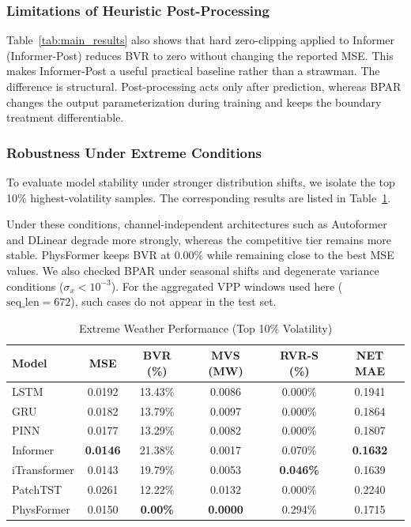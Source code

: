 \subsubsection{Limitations of Heuristic Post-Processing}
\label{subsubsec:compliance}

Table~\ref{tab:main_results} also shows that hard zero-clipping applied to Informer (Informer-Post) reduces BVR to zero without changing the reported MSE. This makes Informer-Post a useful practical baseline rather than a strawman. The difference is structural. Post-processing acts only after prediction, whereas BPAR changes the output parameterization during training and keeps the boundary treatment differentiable.

\subsubsection{Robustness Under Extreme Conditions}
\label{subsubsec:extreme_weather}

To evaluate model stability under stronger distribution shifts, we isolate the top 10\% highest-volatility samples. The corresponding results are listed in Table~\ref{tab:extreme_results}.

Under these conditions, channel-independent architectures such as Autoformer and DLinear degrade more strongly, whereas the competitive tier remains more stable. PhysFormer keeps BVR at $0.00\%$ while remaining close to the best MSE values. We also checked BPAR under seasonal shifts and degenerate variance conditions ($\sigma_x < 10^{-3}$). For the aggregated VPP windows used here ($\text{seq\_len}=672$), such cases do not appear in the test set.

\begin{table}[htbp]
\centering
\caption{Extreme Weather Performance (Top 10\% Volatility)}
\label{tab:extreme_results}
\footnotesize
\setlength{\tabcolsep}{2pt}
\begin{tabular*}{\columnwidth}{@{\extracolsep{\fill}}lccccc@{}}
\toprule
Model & MSE & BVR (\%) & MVS (MW) & RVR-S (\%) & NET MAE \\
\midrule
LSTM & 0.0192 & 13.43\% & 0.0086 & 0.000\% & 0.1941 \\
GRU & 0.0182 & 13.79\% & 0.0097 & 0.000\% & 0.1864 \\
PINN & 0.0177 & 13.29\% & 0.0082 & 0.000\% & 0.1807 \\
Informer & \textbf{0.0146} & 21.38\% & 0.0017 & 0.070\% & \textbf{0.1632} \\
iTransformer & 0.0143 & 19.79\% & 0.0053 & \textbf{0.046\%} & 0.1639 \\
PatchTST & 0.0261 & 12.22\% & 0.0132 & 0.000\% & 0.2240 \\
PhysFormer & 0.0150 & \textbf{0.00\%} & \textbf{0.0000} & 0.294\% & 0.1715 \\
\bottomrule
\end{tabular*}
\end{table}


